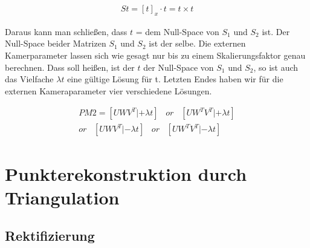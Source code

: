 \begin{gather}
St = [t]_x \cdot t = t \times t
\end{gather} 

Daraus kann man schließen, dass \ensuremath{t} = dem Null-Space von \ensuremath{S_1} und \ensuremath{S_2} ist. Der Null-Space beider Matrizen \ensuremath{S_1} und \ensuremath{S_2} ist der selbe. Die externen Kamerparameter lassen sich wie gesagt nur bis zu einem Skalierungsfaktor genau berechnen. Dass soll heißen, ist der \ensuremath{t} der Null-Space von \ensuremath{S_1} und \ensuremath{S_2}, so ist auch das Vielfache \ensuremath{\lambda t} eine gültige Lösung für t. Letzten Endes haben wir für die externen Kameraparameter vier verschiedene Lösungen. 

\begin{gather}
PM2 = [UWV^T|+\lambda t] \;\;\; or \;\;\;[UW^TV^T|+\lambda t]\\
or\;\;\; [UWV^T|-\lambda t] \;\;\; or \;\;\;[UW^TV^T|-\lambda t]
\end{gather}
\section{Punkterekonstruktion durch Triangulation}
\subsection{Rektifizierung}